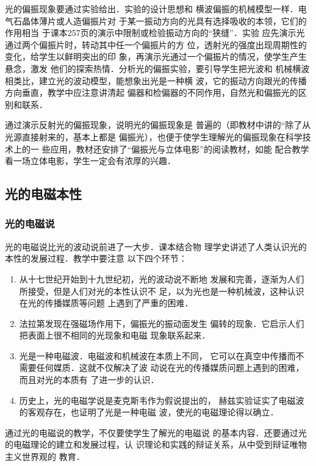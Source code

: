 光的偏振现象要通过实验给出．实验的设计思想和
横波偏振的机械模型一样．电气石晶体薄片或人造偏振片对
于某一振动方向的光具有选择吸收的本领，它们的作用相当
于课本257页的演示中限制或检验振动方向的“狭缝”．实验
应先演示光通过两个偏振片时，转动其中任一个偏振片的方
位，透射光的强度出现周期性的变化，给学生以鲜明突出的印
象，再演示光通过一个偏振片的情况，使学生产生悬念，激发
他们的探索热情．分析光的偏振实验，要引导学生把光波和
机械横波相类比，建立光的波动模型，能想象出光是一种横
波，它的振动方向跟光的传播方向垂直，教学中应注意讲清起
偏器和检偏器的不同作用，自然光和偏振光的区别和联系．

通过演示反射光的偏振现象，说明光的偏振现象是
普遍的（即教材中讲的“除了从光源直接射来的，基本上都是
偏振光），也便于使学生理解光的偏振现象在科学技术上的一
些应用，教材还安排了“偏振光与立体电影”的阅读教材，如能
配合教学看一场立体电影，学生一定会有浓厚的兴趣．

\subsection{光的电磁本性}

\subsubsection{光的电磁说}

光的电磁说比光的波动说前进了一大步．课本结合物
理学史讲述了人类认识光的本性的发展过程．教学中要注意
以下四个环节：
\begin{enumerate}
    \item 从十七世纪开始到十九世纪初，光的波动说不断地
发展和完善，逐渐为人们所接受，但是人们对光的本性认识不
足，以为光也是一种机械波，这种认识在光的传播媒质等问题
上遇到了严重的困难．
\item 法拉第发现在强磁场作用下，偏振光的振动面发生
偏转的现象．它启示人们把表面上很不相同的光现象和电磁
现象联系起来．
\item 光是一种电磁波．电磁波和机械波在本质上不同，
它可以在真空中传播而不需要任何媒质．这就不仅解决了波
动说在光的传播媒质问题上遇到的困难，而且对光的本质有
了进一步的认识．
\item 历史上，光的电磁学说是麦克斯韦作为假说提出的，
赫兹实验证实了电磁波的客观存在，也证明了光是一种电磁
波，使光的电磁理论得以确立．
\end{enumerate}

通过光的电磁说的教学，不仅要使学生了解光的电磁说
的基本内容．还要通过光的电磁理论的建立和发展过程，认
识理论和实践的辩证关系，从中受到辩证唯物主义世界观的
教育．

